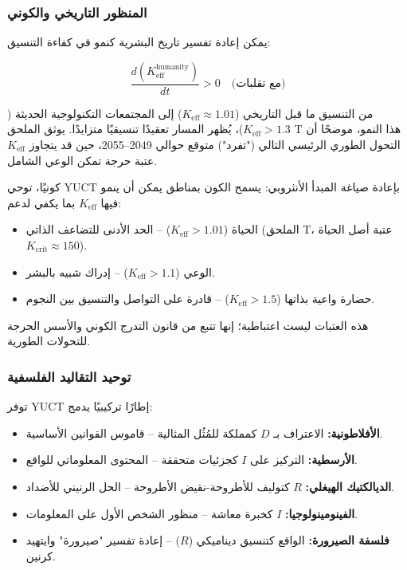 \documentclass[12pt,a4paper]{article}
\newcommand{\eff}{\mathrm{eff}}
\newcommand{\Ke}{K_{\eff}}
\newcommand{\Kcrit}{K_{\mathrm{crit}}}
\begin{document}
	\subsubsection{المنظور التاريخي والكوني}
	
	يمكن إعادة تفسير تاريخ البشرية كنمو في كفاءة التنسيق:
	
	\[
	\frac{d(\Ke^{\text{humanity}})}{dt} > 0 \quad \text{(مع تقلبات)}
	\]
	
	من التنسيق ما قبل التاريخي (\(\Ke \approx 1.01\)) إلى المجتمعات التكنولوجية الحديثة (\(\Ke > 1.3\))، يُظهر المسار تعقيدًا تنسيقيًا متزايدًا. يوثق الملحق T هذا النمو، موضحًا أن التحول الطوري الرئيسي التالي ("تفرد") متوقع حوالي 2049–2055، حين قد يتجاوز \(\Ke\) عتبة حرجة تمكن الوعي الشامل.
	
	كونيًا، توحي YUCT بإعادة صياغة المبدأ الأنثروبي: يسمح الكون بمناطق يمكن أن ينمو فيها \(\Ke\) بما يكفي لدعم:
	\begin{itemize}
		\item الحياة (\(\Ke > 1.01\)) – الحد الأدنى للتضاعف الذاتي (الملحق T، عتبة أصل الحياة \(\Kcrit \approx 150\)).
		\item الوعي (\(\Ke > 1.1\)) – إدراك شبيه بالبشر.
		\item حضارة واعية بذاتها (\(\Ke > 1.5\)) – قادرة على التواصل والتنسيق بين النجوم.
	\end{itemize}
	
	هذه العتبات ليست اعتباطية؛ إنها تتبع من قانون التدرج الكوني والأسس الحرجة للتحولات الطورية.
	
	\subsubsection{توحيد التقاليد الفلسفية}
	
	توفر YUCT إطارًا تركيبيًا يدمج:
	\begin{itemize}
		\item \textbf{الأفلاطونية:} الاعتراف بـ $D$ كمملكة للمُثُل المثالية – قاموس القوانين الأساسية.
		\item \textbf{الأرسطية:} التركيز على $I$ كجزئيات متحققة – المحتوى المعلوماتي للواقع.
		\item \textbf{الديالكتيك الهيغلي:} $R$ كتوليف للأطروحة-نقيض الأطروحة – الحل الرنيني للأضداد.
		\item \textbf{الفينومينولوجيا:} $I$ كخبرة معاشة – منظور الشخص الأول على المعلومات.
		\item \textbf{فلسفة الصيرورة:} الواقع كتنسيق ديناميكي ($R$) – إعادة تفسير "صيرورة" وايتهيد كرنين.
	\end{itemize}
	
\end{document}
